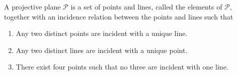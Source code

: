 A projective plane $\mathcal{P}$ is a set of points and lines, called the elements of $\mathcal{P}$, together with an incidence relation between the points and lines such that

\begin{enumerate}
\item[(i)] Any two distinct points are incident with a unique line.
\item[(ii)] Any two distinct lines are incident with a unique point.
\item[(iii)] There exist four points such that no three are incident with one line.
\end{enumerate}
